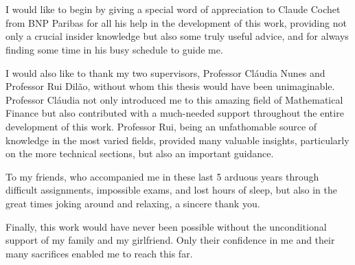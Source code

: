 
\section*{\acknowledgments}

I would like to begin by giving a special word of appreciation to Claude Cochet from BNP Paribas for all his help in the development of this work, providing not only a crucial insider knowledge but also some truly useful advice, and for always finding some time in his busy schedule to guide me.

I would also like to thank my two supervisors, Professor Cláudia Nunes and Professor Rui Dilão, without whom this thesis would have been unimaginable. Professor Cláudia not only introduced me to this amazing field of Mathematical Finance but also contributed with a much-needed support throughout the entire development of this work. Professor Rui, being an unfathomable source of knowledge in the most varied fields, provided many valuable insights, particularly on the more technical sections, but also an important guidance.

To my friends, who accompanied me in these last 5 arduous years through difficult assignments, impossible exams, and lost hours of sleep, but also in the great times joking around and relaxing, a sincere thank you.

Finally, this work would have never been possible without the unconditional support of my family and my girlfriend. Only their confidence in me and their many sacrifices enabled me to reach this far.


